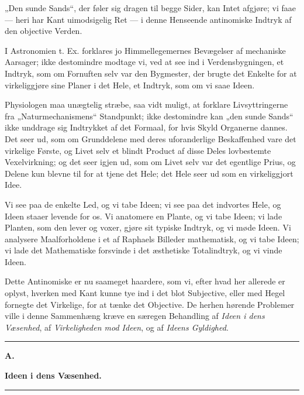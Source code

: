 \documentclass[12pt]{book}
\newcommand{\opage}[1]{\marginnote{\footnotesize\textit{[#1]}}}
\begin{document}
„Den sunde Sands“, der føler sig dragen til begge Sider, kan Intet afgjøre; vi faae — heri har
Kant uimodsigelig Ret — i denne Henseende antinomiske Indtryk af den objective Verden.

I Astronomien t. Ex. forklares jo Himmellegemernes Bevægelser af mechaniske Aarsager; ikke
destomindre modtage vi, ved at see ind i Verdensbygningen, et Indtryk, som om Fornuften selv var
den Bygmester, der brugte det Enkelte for at virkeliggjøre sine Planer i det Hele, et Indtryk,
som om vi saae Ideen.

Physiologen maa unægtelig stræbe, saa vidt muligt, at forklare Livsyttringerne fra
„Naturmechanismens“ Standpunkt; ikke destomindre kan „den sunde Sands“ ikke unddrage sig
Indtrykket af det Formaal, for hvis Skyld Organerne dannes. Det seer ud, som om Grunddelene med
deres uforanderlige Beskaffenhed vare det virkelige Første, og Livet selv et blindt Product af
disse Deles lovbestemte Vexelvirkning; og det seer igjen ud, som om Livet selv var det egentlige
Prius, og Delene kun blevne til for at tjene det Hele; det Hele seer ud som en virkeliggjort
Idee.

Vi see paa de enkelte Led, og vi tabe Ideen; vi see paa det indvortes Hele, og Ideen staaer
levende for os. Vi
\opage{124} anatomere en Plante, og vi tabe Ideen; vi lade Planten, som den lever og voxer, gjøre sit
typiske Indtryk, og vi møde Ideen. Vi analysere Maalforholdene i et af Raphaels Billeder
mathematisk, og vi tabe Ideen; vi lade det Mathematiske forsvinde i det æsthetiske
Totalindtryk, og vi vinde Ideen.

Dette Antinomiske er nu saameget haardere, som vi, efter hvad her allerede er oplyst, hverken
med Kant kunne tye ind i det blot Subjective, eller med Hegel fornegte det Virkelige, for at
tænke det Objective. De herhen hørende Problemer ville i denne Sammenhæng kræve en særegen
Behandling af \emph{Ideen i dens Væsenhed}, af \emph{Virkeligheden mod Ideen}, og af \emph{Ideens
Gyldighed}.

\begin{center}\rule{0.35\linewidth}{0.4pt}\end{center}

\begin{center}
  {\large\bfseries A.}\par\vspace{2pt}
  {\bfseries Ideen i dens Væsenhed.}\par\vspace{4pt}
  \rule{2cm}{0.4pt}
\end{center}
{}
\end{document}
